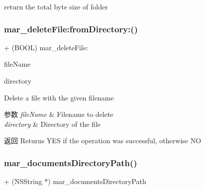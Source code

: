 return the total byte size of folder \mbox{\label{category_n_s_file_manager_07_m_a_r_e_x_08_ab547dd4af4e305d944b72c7ed8ef73da}} 
\subsubsection{\texorpdfstring{mar\+\_\+delete\+File\+:from\+Directory\+:()}{mar\_deleteFile:fromDirectory:()}}
{\footnotesize\ttfamily + (B\+O\+OL) mar\+\_\+delete\+File\+: \begin{DoxyParamCaption}\item[{(N\+S\+String $\ast$ \+\_\+\+Nonnull)}]{file\+Name }\item[{fromDirectory:(M\+A\+R\+Directory\+Type)}]{directory }\end{DoxyParamCaption}}

Delete a file with the given filename


\begin{DoxyParams}{参数}
{\em file\+Name} & Filename to delete \\
\hline
{\em directory} & Directory of the file\\
\hline
\end{DoxyParams}
\begin{DoxyReturn}{返回}
Returns Y\+ES if the operation was successful, otherwise NO 
\end{DoxyReturn}
\mbox{\label{category_n_s_file_manager_07_m_a_r_e_x_08_a2dd533db31c5d66a3bde82627a885981}} 
\subsubsection{\texorpdfstring{mar\+\_\+documents\+Directory\+Path()}{mar\_documentsDirectoryPath()}}
{\footnotesize\ttfamily + (N\+S\+String $\ast$) mar\+\_\+documents\+Directory\+Path \begin{DoxyParamCaption}{ }\end{DoxyParamCaption}}

